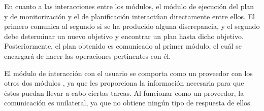 En cuanto a las interacciones entre los módulos, el módulo de ejecución del plan y de
monitorización y el de planificación interactúan directamente entre ellos. El primero
comunica al segundo si se ha producido alguna discrepancia, y el segundo debe determinar
un nuevo objetivo y encontrar un plan hasta dicho objetivo. Posteriormente, el plan obtenido
es comunicado al primer módulo, el cuál se encargará de hacer las operaciones pertinentes
con él.

El módulo de interacción con el usuario se comporta como un proveedor con los otros dos
módulos , ya que les proporciona la información necesaria para que éstos puedan
llevar a cabo ciertas tareas. Al funcionar como un proveedor, la comunicación es unilateral,
ya que no obtiene ningún tipo de respuesta de ellos.
